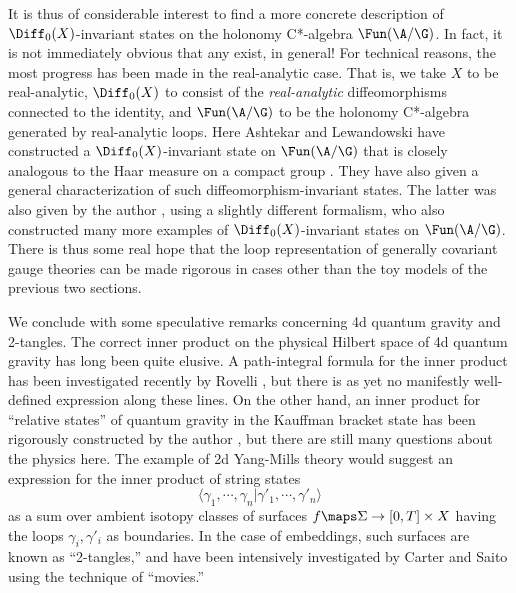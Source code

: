 It is thus of considerable interest to find a more concrete description of
$\Diff_0(X)$-invariant states on the holonomy C*-algebra $\Fun(\A/\G)$.  In
fact, it is not immediately obvious that any exist, in general! For
technical reasons, the most progress has been made in the real-analytic
case.  That is, we take $X$ to be real-analytic, $\Diff_0(X)$  to consist
of the {\it real-analytic} diffeomorphisms connected to the identity, and
$\Fun(\A/\G)$ to be the holonomy C*-algebra generated by real-analytic
loops.  Here Ashtekar and Lewandowski have constructed a
$\Diff_0(X)$-invariant state on $\Fun(\A/\G)$ that is closely analogous to
the Haar measure on a compact group \cite{AL}.  They have also given a
general characterization of such diffeomorphism-invariant states.  The
latter was also given by the author \cite{Baez}, using a slightly different
formalism, who also constructed many more examples of
$\Diff_0(X)$-invariant states on $\Fun(\A/\G)$.   There is thus some real
hope that the loop representation of generally covariant gauge theories can
be made rigorous in cases other than the toy models of the previous two
sections.

We conclude with some speculative remarks concerning 4d quantum gravity and
2-tangles.  The correct inner product on the physical Hilbert space of 4d
quantum gravity has long been quite elusive.   A path-integral formula for
the inner product  has been investigated recently by Rovelli
\cite{Rovelli}, but there is as yet no manifestly well-defined
expression along these lines. On the other hand, an inner product for
``relative states'' of quantum gravity in the Kauffman bracket state has
been rigorously constructed by the author \cite{BaezTang}, but there are
still many questions about the physics here. The example of 2d Yang-Mills
theory would suggest an expression for the inner product of string states
\[           \langle \gamma_1, \cdots, \gamma_n | \gamma'_1, \cdots,
\gamma'_n\rangle  \] as a sum over ambient isotopy classes of surfaces $f
\maps \Sigma \to [0,T] \times X$ having  the loops $\gamma_i, \gamma'_i$ as
boundaries.   In the case of embeddings, such surfaces are known as
``2-tangles,'' and have been intensively investigated by Carter and Saito
\cite{Carter-Saito} using the technique of ``movies.''

